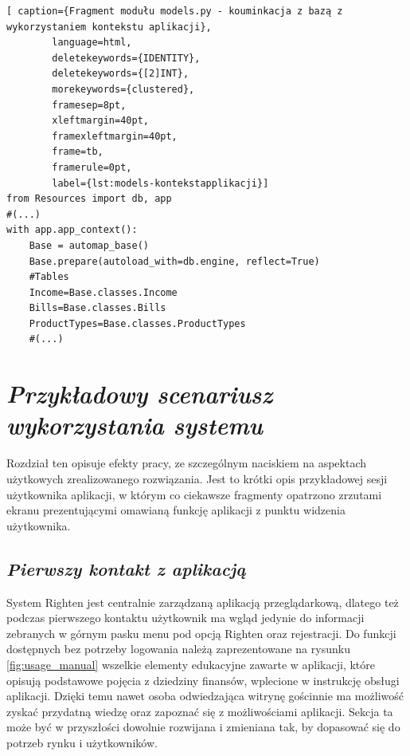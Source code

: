 \documentclass[a4paper, 10pt, twoside, openright]{report}
\newcommand{\customstylechapter}[1]{\large{\textit{#1}}}
\newcommand{\customstylesection}[1]{\textbf{\textit{#1}}}
\begin{document}
\begin{large}
\begin{minipage}{\textwidth}
    \begin{lstlisting}[ caption={Fragment modułu models.py - kouminkacja z bazą z wykorzystaniem kontekstu aplikacji},
        language=html,
        deletekeywords={IDENTITY},
        deletekeywords={[2]INT},
        morekeywords={clustered},
        framesep=8pt,
        xleftmargin=40pt,
        framexleftmargin=40pt,
        frame=tb,
        framerule=0pt,
        label={lst:models-kontekstapplikacji}]
from Resources import db, app
#(...)
with app.app_context():
    Base = automap_base() 
    Base.prepare(autoload_with=db.engine, reflect=True)
    #Tables
    Income=Base.classes.Income
    Bills=Base.classes.Bills
    ProductTypes=Base.classes.ProductTypes
    #(...)\end{lstlisting}
\end{minipage}


\chapter{\customstylechapter{Przykładowy scenariusz wykorzystania systemu}}
{Rozdział ten opisuje efekty pracy, ze szczególnym naciskiem na aspektach 
użytkowych zrealizowanego rozwiązania. Jest to krótki opis przykładowej sesji 
użytkownika aplikacji, w którym co ciekawsze fragmenty opatrzono zrzutami ekranu
 prezentującymi omawianą funkcję aplikacji z punktu widzenia użytkownika.}

\section{\customstylesection{Pierwszy kontakt z aplikacją}}
{System Righten jest centralnie zarządzaną aplikacją przeglądarkową, dlatego też
 podczas pierwszego kontaktu użytkownik ma wgląd jedynie do informacji zebranych
 w górnym pasku menu pod opcją Righten oraz rejestracji. Do funkcji dostępnych 
bez potrzeby logowania należą zaprezentowane na rysunku \ref{fig:usage_manual} 
wszelkie elementy edukacyjne zawarte w aplikacji, które opisują podstawowe 
pojęcia z dziedziny finansów, wplecione w instrukcję obsługi aplikacji. Dzięki 
temu nawet osoba odwiedzająca witrynę gościnnie ma możliwość zyskać przydatną 
wiedzę oraz zapoznać się z możliwościami aplikacji. Sekcja ta może być w 
przyszłości dowolnie rozwijana i zmieniana tak, by dopasować się do potrzeb 
rynku i użytkowników.}


\end{large}
\end{document}
